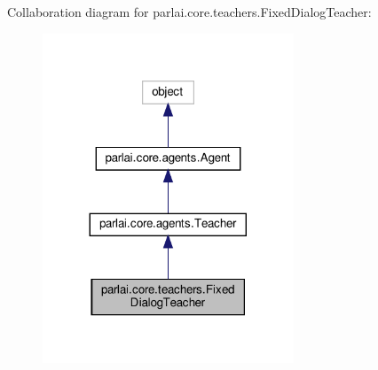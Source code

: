 Collaboration diagram for parlai.\+core.\+teachers.\+Fixed\+Dialog\+Teacher\+:
\nopagebreak
\begin{figure}[H]
\begin{center}
\leavevmode
\includegraphics[width=212pt]{classparlai_1_1core_1_1teachers_1_1FixedDialogTeacher__coll__graph}
\end{center}
\end{figure}
